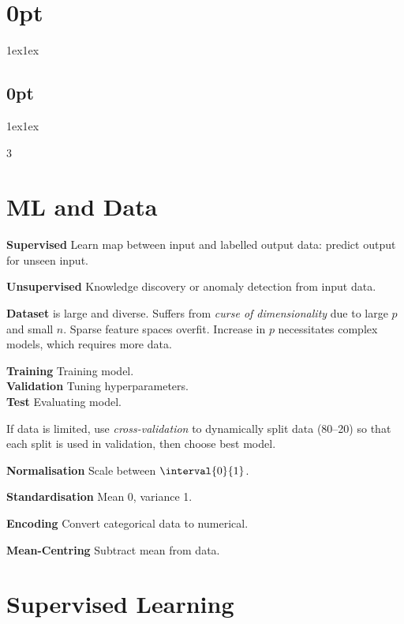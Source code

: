\documentclass{article}
\begin{document}
\titlespacing*\section{0pt}{1ex}{1ex}
\titlespacing*\subsection{0pt}{1ex}{1ex}
%
\setlength\abovecaptionskip{8pt}
\setlength\belowcaptionskip{-15pt}
\setlength\textfloatsep{0pt}
%
\setlength\abovedisplayskip{1pt}
\setlength\belowdisplayskip{1pt}
\begin{multicols}{3}
    \section{ML and Data}
    \textbf{Supervised} Learn map between input and labelled output data:
    predict output for unseen input.

    \textbf{Unsupervised} Knowledge discovery or anomaly detection from input data.

    \textbf{Dataset} is large and diverse. Suffers from \textit{curse of
        dimensionality} due to large \(p\) and small \(n\).
    Sparse feature spaces overfit. Increase in \(p\) necessitates
    complex models, which requires more data.

    \textbf{Training} Training model.\\
    \textbf{Validation} Tuning hyperparameters.\\
    \textbf{Test} Evaluating model.

    If data is limited, use \textit{cross-validation} to dynamically
    split data (80--20) so that each split is used in validation, then
    choose best model.

    \textbf{Normalisation} Scale between \(\interval{0}{1}\).

    \textbf{Standardisation} Mean 0, variance 1.

    \textbf{Encoding} Convert categorical data to numerical.

    \textbf{Mean-Centring} Subtract mean from data.
    \section{Supervised Learning}

\end{multicols}
\end{document}
